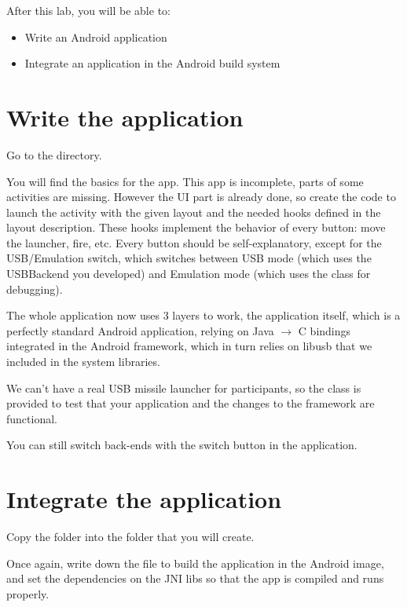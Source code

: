 
After this lab, you will be able to:
\begin{itemize}
  \item Write an Android application
  \item Integrate an application in the Android build system
\end{itemize}

\section{Write the application}

Go to the  directory.

You will find the basics for the  app. This app is incomplete,
parts of some activities are missing. However the UI part is
already done, so create the code to launch the activity with the given
layout and the needed hooks defined in the layout description. These
hooks implement the behavior of every button: move the
launcher, fire, etc.  Every button should be self-explanatory, except
for the USB/Emulation switch, which switches between USB mode (which
uses the USBBackend you developed) and Emulation mode (which uses the
 class for debugging).

The whole application now uses 3 layers to work, the application itself, which
is a perfectly standard Android application, relying on Java $\rightarrow$ C
bindings integrated in the Android framework, which in turn relies on libusb
that we included in the system libraries.

We can't have a real USB missile launcher for participants,
so the  class is provided to test that your application and the
changes to the framework are functional.

You can still switch back-ends with the switch button in the application.

\section{Integrate the application}

Copy the  folder into the folder
 that you will create.

Once again, write down the  file to build the application in the
Android image, and set the dependencies on the JNI libs so that the app
is compiled and runs properly.

